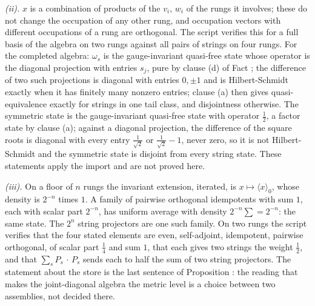 \emph{(ii).} $x$ is a combination of products of the $v_{i}$, $w_{i}$ of the rungs it involves; these do not change the occupation of any other rung, and occupation vectors with different occupations of a rung are orthogonal. The script verifies this for a full basis of the algebra on two rungs against all pairs of strings on four rungs. For the completed algebra: $\omega_{s}$ is the gauge-invariant quasi-free state whose operator is the diagonal projection with entries $s_{j}$, pure by clause (d) of Fact ; the difference of two such projections is diagonal with entries $0, \pm 1$ and is Hilbert-Schmidt exactly when it has finitely many nonzero entries; clause (a) then gives quasi-equivalence exactly for strings in one tail class, and disjointness otherwise. The symmetric state is the gauge-invariant quasi-free state with operator $\tfrac12$, a factor state by clause (a); against a diagonal projection, the difference of the square roots is diagonal with every entry $\tfrac{1}{\sqrt2}$ or $\tfrac{1}{\sqrt2} - 1$, never zero, so it is not Hilbert-Schmidt and the symmetric state is disjoint from every string state. These statements apply the import and are not proved here.

\emph{(iii).} On a floor of $n$ rungs the invariant extension, iterated, is $x \mapsto \langle x\rangle_{0}$, whose density is $2^{-n}$ times $1$. A family of pairwise orthogonal idempotents with sum $1$, each with scalar part $2^{-n}$, has uniform average with density $2^{-n}\sum = 2^{-n}$: the same state. The $2^{n}$ string projectors are one such family. On two rungs the script verifies that the four stated elements are even, self-adjoint, idempotent, pairwise orthogonal, of scalar part $\tfrac14$ and sum $1$, that each gives two strings the weight $\tfrac12$, and that $\sum_{s}P_{s}\,\cdot\,P_{s}$ sends each to half the sum of two string projectors. The statement about the store is the last sentence of Proposition : the reading that makes the joint-diagonal algebra the metric level is a choice between two assemblies, not decided there.

